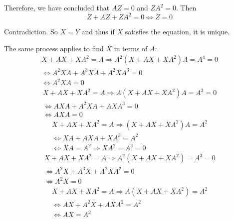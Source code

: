 \documentclass[../../main.tex]{subfiles}
\begin{document}
  Therefore, we have concluded that $A Z = 0$ and $Z A^2 = 0$. Then
  $$
  Z + A Z + Z A^2 = 0 \iff Z = 0
  $$

  Contradiction. So $X = Y$ and thus if $X$ satisfies the equation, it is unique.

  The same process applies to find $X$ in terms of $A$:
  \begin{equation*}
    \begin{split}
      X + A X + X A^2 = A \Longrightarrow
      A^2 (X + A X + X A^2) A = A^4 = 0 \\ \iff
      A^2 X A + A^3 X A + A^2 X A^3 = 0 \\ \iff
      A^2 X A = 0
    \end{split}
  \end{equation*}
  \begin{equation*}
    \begin{split}
      X + A X + X A^2 = A \Longrightarrow
      A (X + A X + X A^2) A = A^3 = 0 \\ \iff
      A X A + A^2 X A + A X A^3 = 0 \\ \iff
      A X A = 0
    \end{split}
  \end{equation*}
  \begin{equation*}
    \begin{split}
      X + A X + X A^2 = A \Longrightarrow
      (X + A X + X A^2) A = A^2 \\ \iff
      X A + A X A + X A^3 = A^2 \\ \iff
      X A = A^2 \Longrightarrow X A^2 = A^3 = 0
    \end{split}
  \end{equation*}
  \begin{equation*}
    \begin{split}
      X + A X + X A^2 = A \Longrightarrow
      A^2 (X + A X + X A^2) = A^3 = 0 \\ \iff
      A^2 X + A^3 X + A^2 X A^2 = 0 \\ \iff
      A^2 X = 0
    \end{split}
  \end{equation*}
  \begin{equation*}
    \begin{split}
      X + A X + X A^2 = A \Longrightarrow
      A (X + A X + X A^2) = A^2 \\ \iff
      A X + A^2 X + A X A^2 = A^2 \\ \iff
      A X = A^2
    \end{split}
  \end{equation*}
\end{document}
